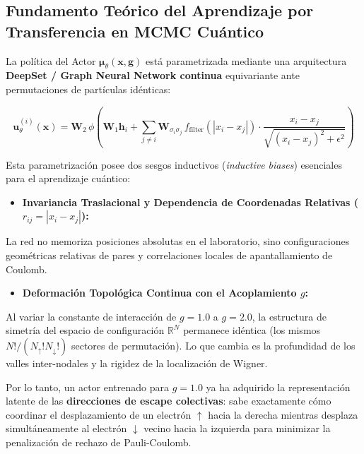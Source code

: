 \documentclass[10pt,a4paper]{article}
\begin{document}
\subsection{Fundamento Teórico del Aprendizaje por Transferencia en MCMC Cuántico}

La política del Actor $\boldsymbol{\mu}_\theta(\mathbf{x}, \mathbf{g})$ está parametrizada mediante una arquitectura \textbf{DeepSet / Graph Neural Network continua} equivariante ante permutaciones de partículas idénticas:



\[
\mathbf{u}_\theta^{(i)}(\mathbf{x}) = \mathbf{W}_2 \,\phi\!\left( \mathbf{W}_1 \mathbf{h}_i + \sum_{j \neq i} \mathbf{W}_{\sigma_i \sigma_j} \, f_{\mathrm{filter}}(|x_i - x_j|) \cdot \frac{x_i - x_j}{\sqrt{(x_i - x_j)^2 + \epsilon^2}} \right)
\]



Esta parametrización posee dos sesgos inductivos (\textit{inductive biases}) esenciales para el aprendizaje cuántico:

\begin{itemize}
\item \textbf{Invariancia Traslacional y Dependencia de Coordenadas Relativas ($r_{ij} = |x_i - x_j|$):}
\end{itemize}

   La red no memoriza posiciones absolutas en el laboratorio, sino configuraciones geométricas relativas de pares y correlaciones locales de apantallamiento de Coulomb.

\begin{itemize}
\item \textbf{Deformación Topológica Continua con el Acoplamiento $g$:}
\end{itemize}

   Al variar la constante de interacción de $g=1.0$ a $g=2.0$, la estructura de simetría del espacio de configuración $\mathbb{R}^N$ permanece idéntica (los mismos $N!/(N_\uparrow! N_\downarrow!)$ sectores de permutación). Lo que cambia es la profundidad de los valles inter-nodales y la rigidez de la localización de Wigner.



Por lo tanto, un actor entrenado para $g=1.0$ ya ha adquirido la representación latente de las \textbf{direcciones de escape colectivas}: sabe exactamente cómo coordinar el desplazamiento de un electrón $\uparrow$ hacia la derecha mientras desplaza simultáneamente al electrón $\downarrow$ vecino hacia la izquierda para minimizar la penalización de rechazo de Pauli-Coulomb.
\end{document}
